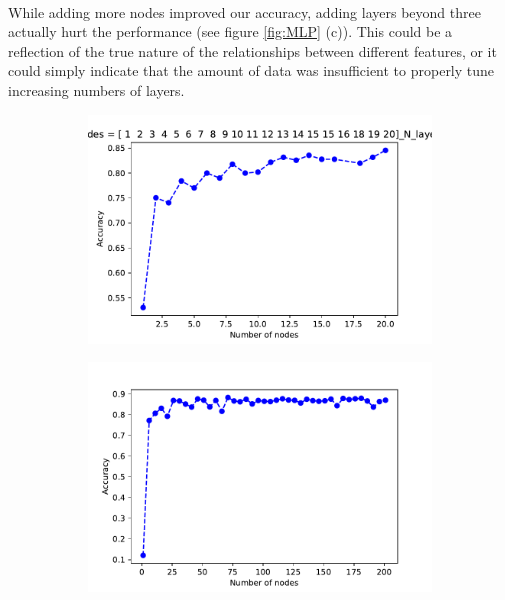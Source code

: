 \documentclass[11pt]{article}
\begin{document}
\paragraph{}While adding more nodes improved our accuracy, adding layers beyond three actually hurt the performance (see figure \ref{fig:MLP} (c)). This could be a reflection of the true nature of the relationships between different features, or it could simply indicate that the amount of data was insufficient to properly tune increasing numbers of layers.
\begin{figure}[] 
\centering
    \begin{subfigure}[!t]{0.3\textwidth}
        \includegraphics[width=\textwidth]{Plots/Alan_features_N_nodes_1_20_N_layers3.pdf}
    \end{subfigure}
        \begin{subfigure}[!t]{0.3\textwidth}
        \includegraphics[width=\textwidth]{Plots/Alan_features_N_nodes_6-201_N_layers3.pdf}

\end{subfigure}
\end{figure}
\end{document}
